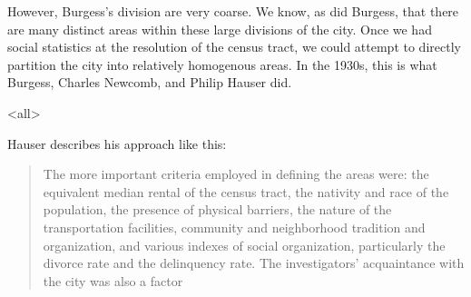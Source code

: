{However, Burgess's division are very coarse. We know, as did
Burgess, that there are many distinct areas within these large
divisions of the city. Once we had social statistics at the
resolution of the census tract, we could attempt to
directly partition the city into relatively homogenous areas. In the
1930s, this is what Burgess, Charles Newcomb, and Philip Hauser did.

\mode<all>{
}

Hauser describes his approach like this: 

\begin{quote}
The more important criteria employed in defining the areas were: the
equivalent median rental of the census tract, the nativity and race of
the population, the presence of physical barriers, the nature of the
transportation facilities, community and neighborhood tradition and
organization, and various indexes of social organization, particularly
the divorce rate and the delinquency rate. The investigators'
acquaintance with the city was also a factor
\end{quote}

}
